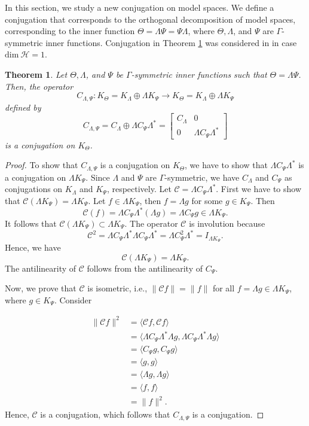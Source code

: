 \documentclass[12pt]{amsart}
\numberwithin{equation}{section}
\newcommand{\hsp}{\mathcal{H}}
\newtheorem{theorem}{Theorem}[section]
\theoremstyle{definition}
\numberwithin{equation}{section}
\begin{document}
\medskip

In this section, we study a new conjugation on model spaces. We define a conjugation that corresponds to the orthogonal decomposition of model spaces, corresponding to the inner function $\Theta=\Lambda\Psi=\Psi\Lambda$, where $\Theta, \Lambda$, and $\Psi$ are $\Gamma$-symmetric inner functions. Conjugation in Theorem \ref{conj} was considered in \cite{CKP} in case $\text{dim}~\hsp=1$.

\begin{theorem}\label{conj}
Let $\Theta, \Lambda$, and $\Psi$ be $\Gamma$-symmetric inner functions such that $\Theta=\Lambda\Psi$. Then, the operator $$C_{\Lambda,\Psi}:K_{\Theta}=K_{\Lambda}\oplus\Lambda K_{\Psi}\to K_{\Theta}=K_{\Lambda}\oplus\Lambda K_{\Psi}$$ defined by
$$C_{\Lambda,\Psi}=C_{\Lambda}\oplus\Lambda C_{\Psi}\Lambda^{*}=\begin{bmatrix}
C_{\Lambda}&0\\
0&\Lambda C_{\Psi}\Lambda^{*}
\end{bmatrix}
$$
is a conjugation on $K_{\Theta}$.
\end{theorem}
\begin{proof}
To show that $C_{\Lambda,\Psi}$ is a conjugation on $K_{\Theta}$, we have to show that $\Lambda C_{\Psi}\Lambda^*$ is a conjugation on $\Lambda K_{\Psi}$. Since $\Lambda$ and $\Psi$ are $\Gamma$-symmetric, we have $C_{\Lambda}$ and $C_{\Psi}$ as conjugations on $K_{\Lambda}$ and $K_{\Psi}$, respectively. Let $\mathcal{C}=\Lambda C_{\Psi}\Lambda^*$. First we have to show that $\mathcal{C}(\Lambda K_\Psi)=\Lambda K_\Psi$.
Let $f\in \Lambda K_\Psi$, then $f=\Lambda g$ for some $g\in K_\Psi$. Then
$$\mathcal{C}(f)=\Lambda C_\Psi\Lambda^*(\Lambda g)=\Lambda C_\Psi g \in \Lambda K_\Psi.$$ It follows that $\mathcal{C}(\Lambda K_\Psi) \subset  \Lambda K_\Psi$.
The operator $\mathcal{C}$ is involution because $$\mathcal{C}^2=\Lambda C_{\Psi}\Lambda^* \Lambda C_{\Psi}\Lambda^*=\Lambda C_{\Psi}^2\Lambda^*=I_{\Lambda K_\Psi}.$$
Hence, we have
$$\mathcal{C}(\Lambda K_\Psi)=\Lambda K_\Psi.$$
The antilinearity of $\mathcal{C}$ follows from the antilinearity of $C_\Psi$.

Now, we prove that $\mathcal{C}$ is isometric, i.e., $\|\mathcal{C}f\|=\|f\|$ for all $f=\Lambda g\in  \Lambda K_{\Psi}$, where $g\in K_{\Psi}$. Consider

\begin{align*}
\|\mathcal{C}f\|^{2}
&=\langle
\mathcal{C}f, \mathcal{C}f
\rangle\\
&=\langle
\Lambda C_\Psi \Lambda^*\Lambda g, \Lambda C_\Psi \Lambda^*\Lambda g
\rangle \\
&=\langle
 C_\Psi g, C_\Psi g
\rangle \\
&=\langle
 g, g
\rangle\\
&=\langle
 \Lambda g, \Lambda g
\rangle\\
&=\langle
 f, f
\rangle\\
&=\|f\|^{2}.
\end{align*}
Hence, $\mathcal{C}$ is a conjugation, which follows that $C_{\Lambda, \Psi}$ is a conjugation.
\end{proof}
\end{document}
